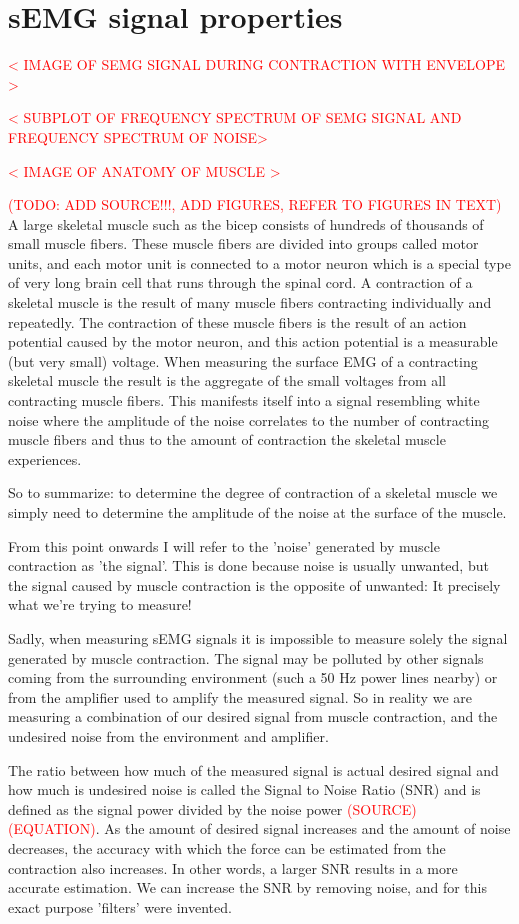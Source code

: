\section{sEMG signal properties}
\textcolor{red}{< IMAGE OF SEMG SIGNAL DURING CONTRACTION WITH ENVELOPE >}

\textcolor{red}{< SUBPLOT OF FREQUENCY SPECTRUM OF SEMG SIGNAL AND FREQUENCY SPECTRUM OF NOISE>}

\textcolor{red}{< IMAGE OF ANATOMY OF MUSCLE >}


\textcolor{red}{(TODO: ADD SOURCE!!!, ADD FIGURES, REFER TO FIGURES IN TEXT)}
A large skeletal muscle such as the bicep consists of hundreds of thousands of small muscle fibers. These muscle fibers are divided into groups called motor units, and each motor unit is connected to a motor neuron which is a special type of very long brain cell that runs through the spinal cord. A contraction of a skeletal muscle is the result of many muscle fibers contracting individually and repeatedly. The contraction of these muscle fibers is the result of an action potential caused by the motor neuron, and this action potential is a measurable (but very small) voltage. When measuring the surface EMG of a contracting skeletal muscle the result is the aggregate of the small voltages from all contracting muscle fibers. This manifests itself into a signal resembling white noise where the amplitude of the noise correlates to the number of contracting muscle fibers and thus to the amount of contraction the skeletal muscle experiences.

So to summarize: to determine the degree of contraction of a skeletal muscle we simply need to determine the amplitude of the noise at the surface of the muscle.

From this point onwards I will refer to the 'noise' generated by muscle contraction as 'the signal'. This is done because noise is usually unwanted, but the signal caused by muscle contraction is the opposite of unwanted: It precisely what we're trying to measure! 

Sadly, when measuring sEMG signals it is impossible to measure solely the signal generated by muscle contraction. The signal may be polluted by other signals coming from the surrounding environment (such a 50 Hz power lines nearby) or from the amplifier used to amplify the measured signal. So in reality we are measuring a combination of our desired signal from muscle contraction, and the undesired noise from the environment and amplifier.

The ratio between how much of the measured signal is actual desired signal and how much is undesired noise is called the Signal to Noise Ratio (SNR) and is defined as the signal power divided by the noise power \textcolor{red}{(SOURCE) (EQUATION)}. As the amount of desired signal increases and the amount of noise decreases, the accuracy with which the force can be estimated from the contraction also increases. In other words, a larger SNR results in a more accurate estimation. We can increase the SNR by removing noise, and for this exact purpose 'filters' were invented.

